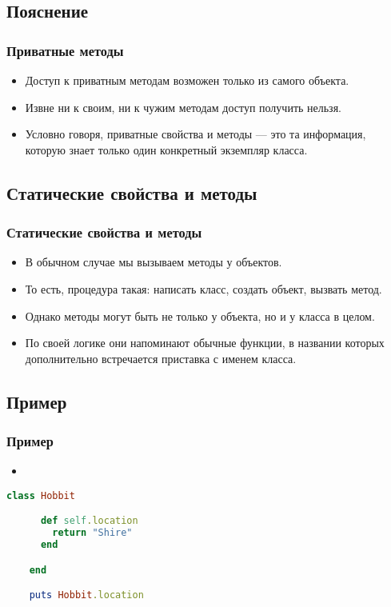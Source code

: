 \documentclass[compress,red]{beamer}
\begin{document}
\subsection{Пояснение}
\begin{frame}[fragile]
  \frametitle{Приватные методы}
  \begin{itemize}
    \item Доступ к приватным методам возможен только из самого объекта.
    \item Извне ни к своим, ни к чужим методам доступ получить нельзя.
    \item Условно говоря, приватные свойства и методы --- это та информация, которую знает только один конкретный экземпляр класса.
  \end{itemize}
\end{frame}

\subsection{Статические свойства и методы}
\begin{frame}[fragile]
  \frametitle{Статические свойства и методы}
  \begin{itemize}
    \item В обычном случае мы вызываем методы у объектов.
    \item То есть, процедура такая: написать класс, создать объект, вызвать метод.
    \item Однако методы могут быть не только у объекта, но и у класса в целом.
    \item По своей логике они напоминают обычные функции, в названии которых дополнительно встречается приставка с именем класса.
  \end{itemize}
\end{frame}

\subsection{Пример}
\begin{frame}[fragile]
  \frametitle{Пример}
  \begin{itemize}
    \item 
  \end{itemize}
  \scriptsize{
  \begin{lstlisting}[language=ruby,basicstyle=\footnotesize,label=ruby6,caption=Пример статического метода]
    class Hobbit

      def self.location
        return "Shire"
      end

    end

    puts Hobbit.location
  \end{lstlisting}
  }
  
\end{frame}
\end{document}
